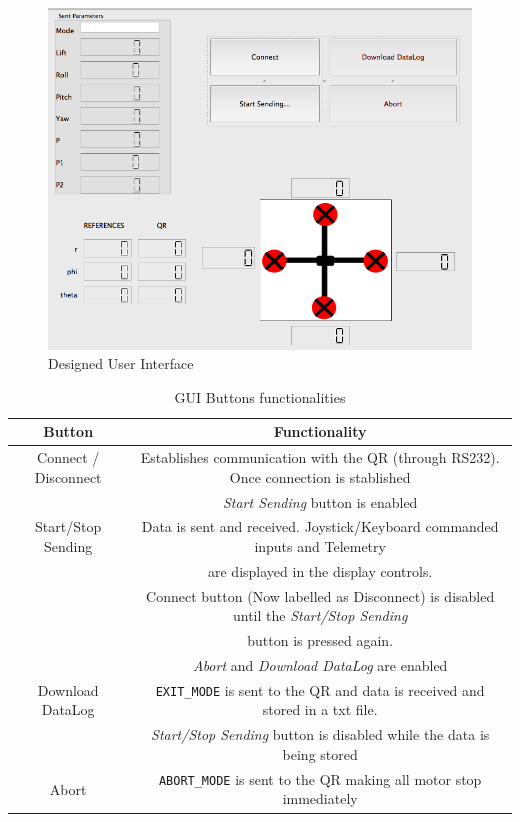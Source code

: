 \documentclass{article}
\begin{document}
\begin{figure}[ht]
\centering
	\includegraphics[scale=0.4]{Figures/GUI.png}
	\caption{Designed User Interface}
	\label{fig.GUI}
\end{figure}

\begin{table}[ht]
\centering
\caption{GUI Buttons functionalities}
\begin{tabular}{|c|c|}
\hline 
\textbf{Button} & \textbf{Functionality} \\ 
\hline 
\hline 
Connect / Disconnect & Establishes communication with the QR (through RS232). Once connection is stablished \\ & \emph{Start Sending} button is enabled\\ 
\hline 
Start/Stop Sending & Data is sent and received. Joystick/Keyboard commanded inputs and Telemetry \\ & are displayed   in the display controls. 
\\ & Connect button (Now labelled as Disconnect) is disabled until the \emph{Start/Stop Sending} \\ & button is pressed again.
\\ & \emph{Abort} and \emph{Download DataLog} are enabled
\\
\hline 
Download DataLog & \texttt{EXIT\_MODE} is sent to the QR and data is received and stored in a txt file. 
\\ & \emph{Start/Stop Sending} button is disabled while the data is being stored\\
\hline 
Abort & \texttt{ABORT\_MODE} is sent to the QR making all motor stop immediately\\ 
\hline 
\end{tabular} 
\label{tbl:GUIButts}
\end{table}
\end{document}
